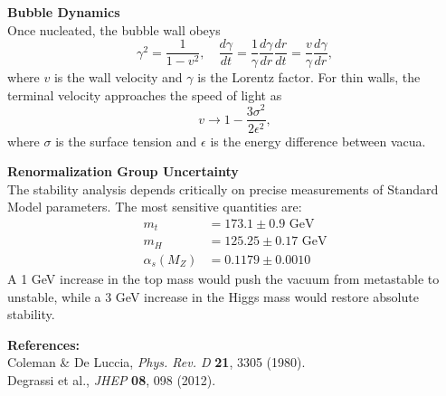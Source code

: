 \begin{technical}
\textbf{Bubble Dynamics}\\[0.5em]
Once nucleated, the bubble wall obeys
$$
\gamma^2 = \frac{1}{1-v^2}, \quad \frac{d\gamma}{dt} = \frac{1}{\gamma}\frac{d\gamma}{dr}\frac{dr}{dt} = \frac{v}{\gamma}\frac{d\gamma}{dr},
$$
where $v$ is the wall velocity and $\gamma$ is the Lorentz factor. For thin walls, the terminal velocity approaches the speed of light as
$$
v \to 1 - \frac{3\sigma^2}{2\epsilon^2},
$$
where $\sigma$ is the surface tension and $\epsilon$ is the energy difference between vacua.

\textbf{Renormalization Group Uncertainty}\\[0.5em]
The stability analysis depends critically on precise measurements of Standard Model parameters. The most sensitive quantities are:
\begin{align}
m_t &= 173.1 \pm 0.9 \text{ GeV} \\
m_H &= 125.25 \pm 0.17 \text{ GeV} \\
\alpha_s(M_Z) &= 0.1179 \pm 0.0010
\end{align}
A 1 GeV increase in the top mass would push the vacuum from metastable to unstable, while a 3 GeV increase in the Higgs mass would restore absolute stability.

\vspace{0.5em}
\textbf{References:}\\
Coleman \& De Luccia, \textit{Phys. Rev. D} \textbf{21}, 3305 (1980).\\
Degrassi et al., \textit{JHEP} \textbf{08}, 098 (2012).
\end{technical}
